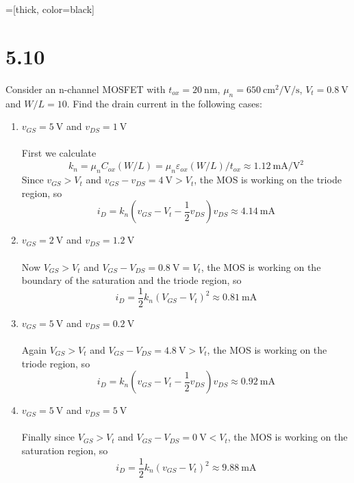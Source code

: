\documentclass[12pt, a4paper]{article}
\title{} %
\author{} %
\date{} %
\begin{document}
=[thick, color=black]
\section{5.10}
Consider an n-channel MOSFET with $t_{ox} = \SI{20}\nm$, $\mu_{n} = \SI{650}{\cm\squared\per\V\per\s}$, $V_t = \SI{0.8}\V$ and $W/L = 10$. Find the drain current in the following cases:

\begin{enumerate}[label=(\alph*)]
  \item $v_{GS} = \SI{5}{\V}$ and $v_{DS} = \SI{1}{\V} $\\[5pt]
    \Ans \\
    First we calculate 
    \[ k_n = \mu_n C_{ox} (W / L) = \mu_n \varepsilon_{ox} (W / L) /  t_{ox} \approx \SI{1.12}{\mA\per\V\squared} \]
    Since $v_{GS} > V_t$ and $v_{GS} - v_{DS} = \SI{4}{\V} > V_t$, the MOS is working on the triode region, so 
    \[
      i_D =  k_n \left(v_{GS} - V_t - \frac{1}{2}v_{DS} \right)v_{DS} \approx \SI{4.14}{\mA} 
    \]
  \item $v_{GS} = \SI{2}{\V}$ and $v_{DS} = \SI{1.2}{\V} $\\[5pt]
    \Ans \\
    Now $V_{GS} > V_t$ and $V_{GS} - V_{DS} = \SI{0.8}{\V} = V_t$, the MOS is working on the boundary of the saturation and the triode region, so 
    \[
      i_D = \frac{1}{2} k_n (V_{GS} - V_t)^2 \approx \SI{0.81}{\mA} 
    \]
  \item $v_{GS} = \SI{5}{\V}$ and $v_{DS} = \SI{0.2}{\V} $\\[5pt]
    \Ans \\
    Again $V_{GS} > V_t$ and $V_{GS} - V_{DS} = \SI{4.8}{\V} > V_t$, the MOS is working on the triode region, so 
    \[
      i_D =  k_n \left(v_{GS} - V_t - \frac{1}{2}v_{DS} \right)v_{DS} \approx \SI{0.92}{\mA} 
    \]
  \item $v_{GS} = \SI{5}{\V}$ and $v_{DS} = \SI{5}{\V} $\\[5pt]
    \Ans \\
    Finally since $V_{GS} > V_t$ and $V_{GS} - V_{DS} = \SI{0}{\V} < V_t$, the MOS is working on the saturation region, so 
    \[
      i_D =  \frac{1}{2} k_n (v_{GS} - V_t)^2 \approx \SI{9.88}{\mA} 
    \]
\end{enumerate}
\end{document}
